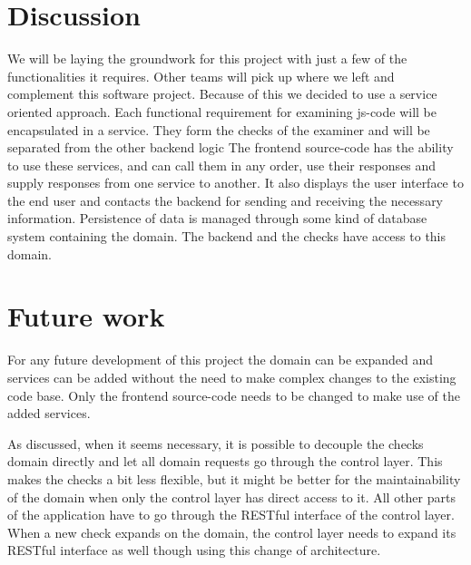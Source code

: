 \section{Discussion}
We will be laying the groundwork for this project
with just a few of the functionalities it requires.
Other teams will pick up where we left and complement this software project.
Because of this we decided to use a service oriented approach.
Each functional requirement for examining \gls{js-code}
will be encapsulated in a service.
They form the \glspl{check} of the \gls{examiner}
and will be separated from the other backend logic
The frontend \gls{source-code} has the ability to use these services,
and can call them in any order, use their responses
and supply responses from one service to another.
It also displays the user interface to the end user
and contacts the backend for sending and receiving the necessary information.
Persistence of data is managed through some kind of database system
containing the domain.
The backend and the \glspl{check} have access to this domain.

\section{Future work}
For any future development of this project
the domain can be expanded
and services can be added
without the need to make complex changes to the existing code base.
Only the frontend \gls{source-code} needs to be changed
to make use of the added services.

As discussed, when it seems necessary,
it is possible to decouple the \glspl{check} domain directly
and let all domain requests go through the control layer.
This makes the \glspl{check} a bit less flexible,
but it might be better for the maintainability of the domain
when only the control layer has direct access to it.
All other parts of the application have to go through the RESTful interface
of the control layer.
When a new \gls{check} expands on the domain,
the control layer needs to expand its RESTful interface as well though
using this change of architecture.
